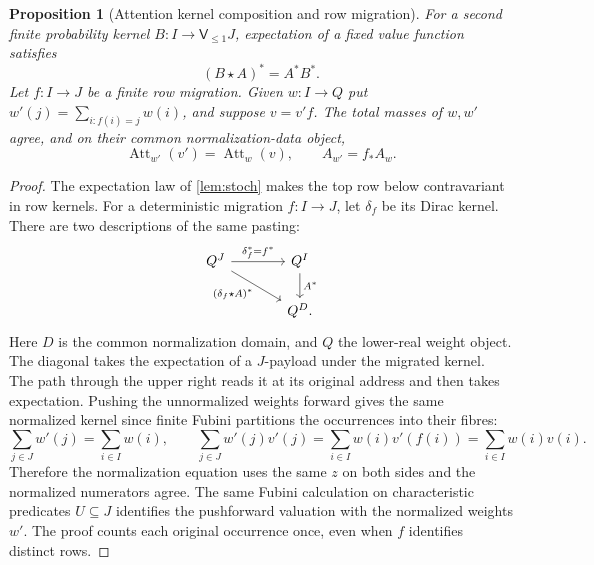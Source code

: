 \documentclass[11pt,a4paper]{article}
\newtheorem{proposition}[proposition]{Proposition}
\theoremstyle{definition}
\theoremstyle{remark}\newaliascnt{remark}{theorem}
\numberwithin{equation}{section}
\begin{document}
\begin{proposition}[Attention kernel composition and row migration]
\label{prop:attention-migration}
For a second finite probability kernel $B:I\to\mathsf V_{\le1}J$,
expectation of a fixed value function satisfies
\begin{equation}\label{eq:attention-kleisli}
 (B\star A)^*=A^*B^*.
\end{equation}
Let $f:I\to J$ be a finite row migration. Given $w:I\to Q$ put
$w'(j)=\sum_{i:f(i)=j}w(i)$, and suppose $v=v'f$. The total masses
of $w,w'$ agree, and on their common normalization-data object,
\begin{equation}\label{eq:attention-migration}
 \operatorname{Att}_{w'}(v')=\operatorname{Att}_w(v),
 \qquad A_{w'}=f_* A_w.
\end{equation}
\end{proposition}
\begin{proof}
The expectation law of \cref{lem:stoch} makes the top row below contravariant in row kernels. For a deterministic migration \(f:I\to J\), let \(\delta_f\) be its Dirac kernel. There are two descriptions of the same pasting:
\[
\begin{tikzcd}[column sep=large]
 Q^J\arrow[r,"{\delta_f^*=f^*}"]\arrow[dr,"{(\delta_f\star A)^*}"']&
 Q^I\arrow[d,"A^*"]\\
 &Q^D .
\end{tikzcd}
\]
Here \(D\) is the common normalization domain, and \(Q\) the lower-real weight object. The diagonal takes the expectation of a \(J\)-payload under the migrated kernel. The path through the upper right reads it at its original address and then takes expectation. Pushing the unnormalized weights forward gives the same normalized kernel since finite Fubini partitions the occurrences into their fibres:
\[
 \sum_{j\in J}w'(j)=\sum_{i\in I}w(i),\qquad
 \sum_{j\in J}w'(j)v'(j)
 =\sum_{i\in I}w(i)v'(f(i))=\sum_{i\in I}w(i)v(i).
\]
Therefore the normalization equation uses the same $z$ on both sides
and the normalized numerators agree. The same Fubini calculation on
characteristic predicates $U\subseteq J$ identifies the pushforward
valuation with the normalized weights $w'$. The proof counts each
original occurrence once, even when $f$ identifies distinct rows.
\end{proof}
\end{document}

